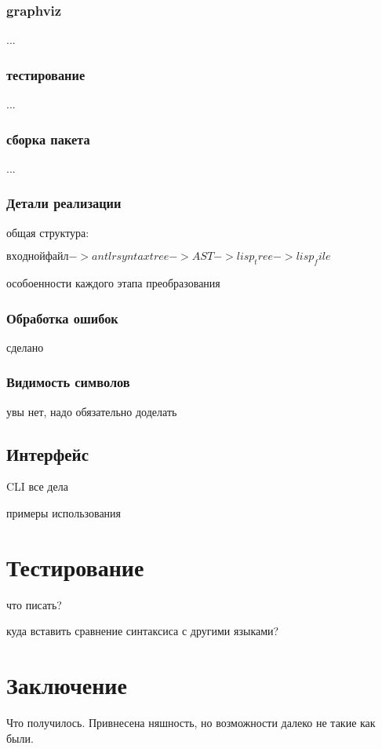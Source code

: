 \documentclass[12pt,a4paper,oneside]{extarticle}
\begin{document}
        \subsubsection{graphviz}
            ...
        \subsubsection{тестирование}
            ...
        \subsubsection{сборка пакета}
            ...

    \subsubsection{Детали реализации}
        общая структура:

        $входной файл -> antlr syntax tree -> AST -> lisp_tree -> lisp_file$

        особоенности каждого этапа преобразования
        \subsubsection{Обработка ошибок}
            сделано
        \subsubsection{Видимость символов}
            увы нет, надо обязательно доделать
        
    \subsection{Интерфейс}
        CLI все дела

        примеры использования

        

\clearpage

\section{Тестирование}
    что писать?

    куда вставить сравнение синтаксиса с другими языками? 
\clearpage

\section{Заключение}
    Что получилось. Привнесена няшность, но возможности далеко не такие как были.
\clearpage
\end{document}
